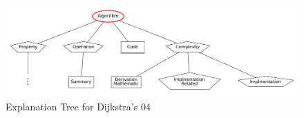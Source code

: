 \begin{figure}[H]
  \includegraphics[scale=0.2]{DJK_tree}
    
    
\caption{Explanation Tree for Dijkstra's 04}
\label{fig:djk-tree}
\end{figure}